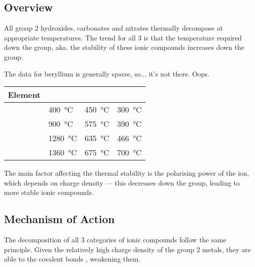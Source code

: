 		\subsection{Overview}

			All group 2 hydroxides, carbonates and nitrates thermally decompose at appropriate
			temperatures. The trend for all 3 is that the temperature required  down
			the group, aka. the stability of these ionic compounds increases down the group.

			The data for beryllium is generally sparse, so... it's not there. Oops.

			\begin{table}[htb]\renewcommand{\arraystretch}{1.5}\begin{center}
			\begin{tabu} to 0.8\textwidth {X[3,c,m] | X[c,m] | X[c,m] | X[c,m]}

				Element &              &           &            \\ \hline
				 &   \SI{400}{\celsius}  &   \SI{450}{\celsius}  &   \SI{300}{\celsius}  \\
				 &   \SI{900}{\celsius}  &   \SI{575}{\celsius}  &   \SI{390}{\celsius}  \\
				 &   \SI{1280}{\celsius} &   \SI{635}{\celsius}  &   \SI{466}{\celsius}  \\
				 &   \SI{1360}{\celsius} &   \SI{675}{\celsius}  &   \SI{700}{\celsius}  \\

			\end{tabu}\end{center}
			\end{table}\vspace{-1em}

			The main factor affecting the thermal stability is the polarising power of the ion, which depends
			on charge density --- this decreases down the group, leading to more stable ionic compounds.


		\subsection{Mechanism of Action}

			The decomposition of all 3 categories of ionic compounds follow the same principle. Given the
			relatively high charge density of the group 2 metals, they are able to  the
			covalent bonds , weakening them.

